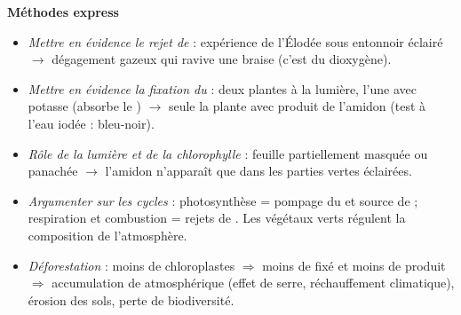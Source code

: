 \documentclass[11pt]{article}
\begin{document}
\begin{bilan}
\textbf{Méthodes express}
\begin{itemize}
  \item \emph{Mettre en évidence le rejet de } : expérience de l'Élodée sous entonnoir éclairé $\rightarrow$ dégagement gazeux qui ravive une braise (c'est du dioxygène).
  \item \emph{Mettre en évidence la fixation du } : deux plantes à la lumière, l'une avec potasse (absorbe le ) $\rightarrow$ seule la plante avec  produit de l'amidon (test à l'eau iodée : bleu-noir).
  \item \emph{Rôle de la lumière et de la chlorophylle} : feuille partiellement masquée ou panachée $\rightarrow$ l'amidon n'apparaît que dans les parties vertes éclairées.
  \item \emph{Argumenter sur les cycles} : photosynthèse = pompage du  et source de  ; respiration et combustion = rejets de . Les végétaux verts régulent la composition de l'atmosphère.
  \item \emph{Déforestation} : moins de chloroplastes $\Rightarrow$ moins de  fixé et moins de  produit $\Rightarrow$ accumulation de  atmosphérique (effet de serre, réchauffement climatique), érosion des sols, perte de biodiversité.
\end{itemize}
\end{bilan}
\end{document}
